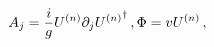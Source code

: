 \begin{equation}
A_j  =  \frac{i}{g}U^{(n)}\partial_j{U^{(n)}}^\dag \, , \\
\Phi  =  vU^{(n)} \, ,
\label{Vacua3D}
\end{equation}

